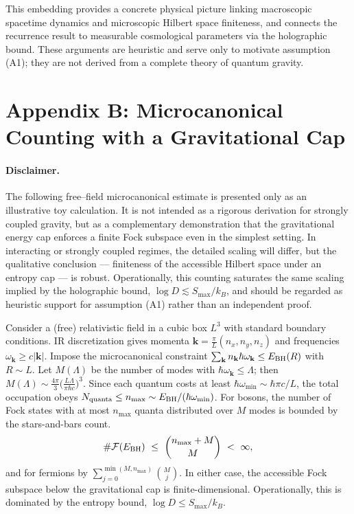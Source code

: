\documentclass[12pt]{article}
\newcommand{\Smax}{S_{\max}}
\theoremstyle{remark}
\begin{document}
This embedding provides a concrete physical picture linking macroscopic spacetime dynamics and microscopic Hilbert space finiteness, and connects the recurrence result to measurable cosmological parameters via the holographic bound. These arguments are heuristic and serve only to motivate assumption (A1); they are not derived from a complete theory of quantum gravity.

\section*{Appendix B: Microcanonical Counting with a Gravitational Cap}
\label{app:microcanonical}

\paragraph{Disclaimer.}
The following free--field microcanonical estimate is presented only as an
illustrative toy calculation. It is not intended as a rigorous derivation
for strongly coupled gravity, but as a complementary demonstration that
the gravitational energy cap enforces a finite Fock subspace even in the
simplest setting. In interacting or strongly coupled regimes, the detailed
scaling will differ, but the qualitative conclusion --- finiteness of the
accessible Hilbert space under an entropy cap --- is robust. Operationally,
this counting saturates the same scaling implied by the holographic bound,
$\log D \lesssim S_{\max}/k_B$, and should be regarded as heuristic support
for assumption (A1) rather than an independent proof.


Consider a (free) relativistic field in a cubic box $L^3$ with standard boundary conditions. IR discretization gives momenta $\mathbf k=\frac{\pi}{L}(n_x,n_y,n_z)$ and frequencies $\omega_{\mathbf k}\ge c|\mathbf k|$. Impose the microcanonical constraint $\sum_{\mathbf k} n_{\mathbf k}\hbar\omega_{\mathbf k}\le E_{\rm BH}(R)$ with $R\sim L$.
Let $M(\Lambda)$ be the number of modes with $\hbar\omega_{\mathbf k}\le \Lambda$; then $M(\Lambda)\sim \frac{4\pi}{3}\big(\frac{L\Lambda}{\pi\hbar c}\big)^3$. Since each quantum costs at least $\hbar\omega_{\min}\sim \hbar\pi c/L$, the total occupation obeys $N_{\text{quanta}}\le n_{\max}\sim E_{\rm BH}/(\hbar\omega_{\min})$.
For bosons, the number of Fock states with at most $n_{\max}$ quanta distributed over $M$ modes is bounded by the stars-and-bars count.
\[
\#\mathcal{F}(E_{\rm BH})\ \le\ \binom{n_{\max}+M}{M}\ <\ \infty,
\]
and for fermions by $\sum_{j=0}^{\min(M,n_{\max})}\binom{M}{j}$. In either case, the accessible Fock subspace below the gravitational cap is finite-dimensional. Operationally, this is dominated by the entropy bound, $\log D\le \Smax/k_B$.
\end{document}
